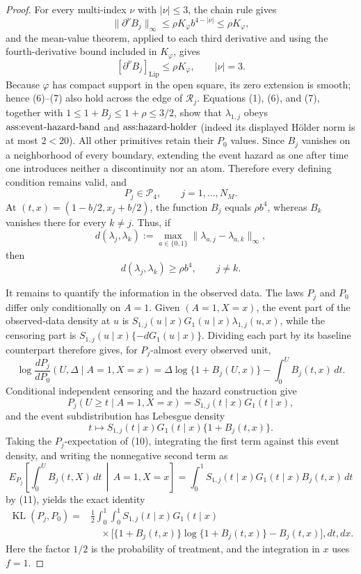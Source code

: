 \documentclass{article}
\begin{document}
\begin{proof}
For every multi-index \(\nu\) with \(|\nu|\le3\), the chain rule gives
\[
 \lVert\partial^\nu B_j\rVert_\infty
 \le \rho K_\varphi b^{4-|\nu|}
 \le \rho K_\varphi,                                    \tag{6}
\]
and the mean-value theorem, applied to each third derivative and using the fourth-derivative bound included in \(K_\varphi\), gives
\[
 [\partial^\nu B_j]_{\mathrm{Lip}}
 \le \rho K_\varphi,
 \qquad |\nu|=3.                                         \tag{7}
\]
Because \(\varphi\) has compact support in the open square, its zero extension is smooth; hence (6)--(7) also hold across the edge of \(\mathcal R_j\).  Equations (1), (6), and (7), together with \(1\le1+B_j\le1+\rho\le3/2\), show that \(\lambda_{1,j}\) obeys \(\textnormal{ass:event-hazard-band}\) and \(\textnormal{ass:hazard-holder}\) (indeed its displayed Hölder norm is at most \(2<20\)).  All other primitives retain their \(P_0\) values.  Since \(B_j\) vanishes on a neighborhood of every boundary, extending the event hazard as one after time one introduces neither a discontinuity nor an atom.  Therefore every defining condition remains valid, and
\[
 P_j\in\mathcal P_4,
 \qquad j=1,\ldots,N_M.                                  \tag{8}
\]
At \((t,x)=(1-b/2,x_j+b/2)\), the function \(B_j\) equals \(\rho b^4\), whereas \(B_k\) vanishes there for every \(k\ne j\).  Thus, if
\[
 d(\lambda_j,\lambda_k)
 :=\max_{a\in\{0,1\}}\lVert\lambda_{a,j}-\lambda_{a,k}\rVert_\infty,
\]
then
\[
 d(\lambda_j,\lambda_k)\ge\rho b^4,
 \qquad j\ne k.                                          \tag{9}
\]

It remains to quantify the information in the observed data.  The laws \(P_j\) and \(P_0\) differ only conditionally on \(A=1\).  Given \((A=1,X=x)\), the event part of the observed-data density at \(u\) is \(S_{1,j}(u\mid x)G_1(u\mid x)\lambda_{1,j}(u,x)\), while the censoring part is \(S_{1,j}(u\mid x)\{-dG_1(u\mid x)\}\).  Dividing each part by its baseline counterpart therefore gives, for \(P_j\)-almost every observed unit,
\[
 \log\frac{dP_j}{dP_0}(U,\Delta\mid A=1,X=x)
 =\Delta\log\{1+B_j(U,x)\}-\int_0^U B_j(t,x)\,dt.       \tag{10}
\]
Conditional independent censoring and the hazard construction give
\[
 P_j(U\ge t\mid A=1,X=x)=S_{1,j}(t\mid x)G_1(t\mid x),  \tag{11}
\]
and the event subdistribution has Lebesgue density
\[
 t\longmapsto S_{1,j}(t\mid x)G_1(t\mid x)\{1+B_j(t,x)\}.
\]
Taking the \(P_j\)-expectation of (10), integrating the first term against this event density, and writing the nonnegative second term as
\[
 E_{P_j}\!\left[\int_0^U B_j(t,X)\,dt\,\middle|\,A=1,X=x\right]
 =\int_0^1 S_{1,j}(t\mid x)G_1(t\mid x)B_j(t,x)\,dt
\]
by (11), yields the exact identity
\[
 \begin{split}
 \operatorname{KL}(P_j,P_0)
 ={}&\frac12\int_0^1\!\int_0^1
 S_{1,j}(t\mid x)G_1(t\mid x)\\
 &\quad\times\bigl[\{1+B_j(t,x)\}\log\{1+B_j(t,x)\}-B_j(t,x)\bigr],dt,dx.
 \end{split}                                               \tag{12}
\]
Here the factor \(1/2\) is the probability of treatment, and the integration in \(x\) uses \(f=1\).


\end{proof}
\end{document}

